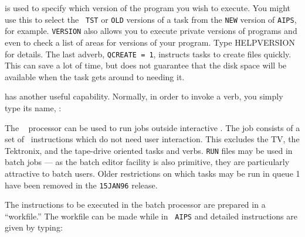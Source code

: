      {\tt {}} is used to specify which version of the
program you wish to execute.  You might use this to select the {\tt
TST} or {\tt OLD} versions of a task from the {\tt NEW} version of
{\tt AIPS}, for example. {\tt VERSION} also allows you to execute
private versions of programs and even to check a list of areas for
versions of your program.  Type {\us HELP\qs VERSION \CR} for details.
The last adverb, {\tt QCREATE = 1}, instructs tasks to create files
quickly.  This can save a lot of time, but does not guarantee that the
disk space will be available when the task gets around to needing it.

     {\tt {}} has another useful capability.  Normally, in
order to invoke a verb, you simply type its name, \eg:


     The \AIPS\  processor can be used to run jobs outside
interactive \AIPS\@.  The job consists of a set of \AIPS\ instructions
which do not need user interaction.  This excludes the TV, the
Tektronix, and the tape-drive oriented tasks and verbs.  {\tt RUN}
files may be used in batch jobs --- as the batch editor facility
is also primitive, they are particularly attractive to batch users.
Older restrictions on which tasks may be run in queue 1 have been
removed in the {\tt 15JAN96} release.

     The instructions to be executed in the batch processor are
prepared in a ``workfile.''  The workfile can be made while in {\tt
AIPS} and detailed instructions are given by typing:
\pd

